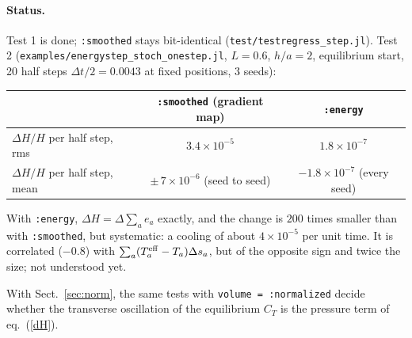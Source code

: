 \documentclass[11pt,aps,preprint,nofootinbib,superscriptaddress,tightenlines]{revtex4-2}
\def\Eq#1{eq.~(\ref{#1})}
\def\Sect#1{Sect.~\ref{#1}}
\let\oldparagraph\paragraph
\renewcommand{\paragraph}{\par\bigskip\oldparagraph}
\begin{document}
\paragraph{Status.}  Test 1 is done; \texttt{:smoothed} stays bit-identical
(\texttt{test/testregress\_step.jl}).  Test 2 (\texttt{examples/energystep\_stoch\_onestep.jl},
$L=0.6$, $h/a=2$, equilibrium start, 20 half steps $\Delta t/2=0.0043$ at fixed positions,
3 seeds):
\begin{center}
\begin{tabular}{lcc}
\hline
 & \texttt{:smoothed} (gradient map) & \texttt{:energy} \\ \hline
$\Delta H/H$ per half step, rms & $3.4\times10^{-5}$ & $1.8\times10^{-7}$ \\
$\Delta H/H$ per half step, mean & $\pm\,7\times10^{-6}$ (seed to seed) & $-1.8\times10^{-7}$ (every seed) \\
\hline
\end{tabular}
\end{center}
With \texttt{:energy}, $\Delta H=\Delta\sum_ae_a$ exactly, and the change is $200$ times smaller
than with \texttt{:smoothed}, but systematic: a cooling of about $4\times10^{-5}$ per unit
time.  It is correlated ($-0.8$) with $\sum_a(T^{\rm eff}_a-T_a)\Delta s_a$, but of the
opposite sign and twice the size; not understood yet.

With \Sect{sec:norm}, the same tests with \texttt{volume = :normalized} decide whether the
transverse oscillation of the equilibrium $C_T$ is the pressure term of \Eq{dH}.
\end{document}
